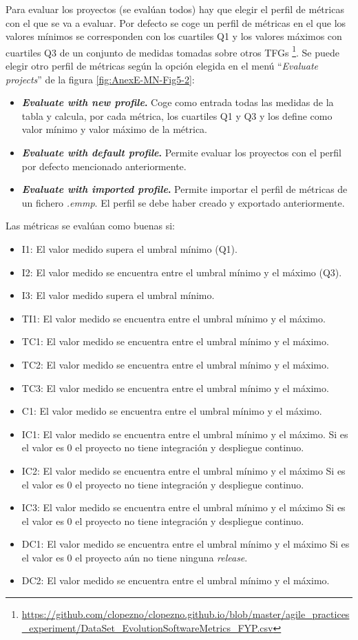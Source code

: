 Para evaluar los proyectos (se evalúan todos) hay que elegir el perfil de métricas con el que se va a evaluar. Por defecto se coge un perfil de métricas en el que los valores mínimos se corresponden con los cuartiles Q1 y los valores máximos con cuartiles Q3 de un conjunto de medidas tomadas sobre otros TFGs \footnote{\url{https://github.com/clopezno/clopezno.github.io/blob/master/agile_practices_experiment/DataSet_EvolutionSoftwareMetrics_FYP.csv}}\cite{lopez_portal_2019}. Se puede elegir otro perfil de métricas según la opción elegida en el menú ``\textit{Evaluate projects}'' de la figura \ref{fig:AnexE-MN-Fig5-2}:
\begin{itemize}
	\item \textbf{\textit{Evaluate with new profile}.} Coge como entrada todas las medidas de la tabla y calcula, por cada métrica, los cuartiles Q1 y Q3 y los define como valor mínimo y valor máximo de la métrica.
	\item \textbf{\textit{Evaluate with default profile}.} Permite evaluar los proyectos con el perfil por defecto mencionado anteriormente.
	\item \textbf{\textit{Evaluate with imported profile}.} Permite importar el perfil de métricas de un fichero \textit{.emmp}. El perfil se debe haber creado y exportado anteriormente.
\end{itemize}

Las métricas se evalúan como buenas si:
\begin{itemize}
	\item I1: El valor medido supera el umbral mínimo (Q1).
	\item I2: El valor medido se encuentra entre el umbral mínimo y el máximo (Q3).
	\item I3: El valor medido supera el umbral mínimo.
	\item TI1: El valor medido se encuentra entre el umbral mínimo y el máximo.
	\item TC1: El valor medido se encuentra entre el umbral mínimo y el máximo.
	\item TC2: El valor medido se encuentra entre el umbral mínimo y el máximo.
	\item TC3: El valor medido se encuentra entre el umbral mínimo y el máximo.
	\item C1: El valor medido se encuentra entre el umbral mínimo y el máximo.
	\item IC1: El valor medido se encuentra entre el umbral mínimo y el máximo. Si es el valor es 0 el proyecto no tiene integración y despliegue continuo.
	\item IC2: El valor medido se encuentra entre el umbral mínimo y el máximo Si es el valor es 0 el proyecto no tiene integración y despliegue continuo.
	\item IC3: El valor medido se encuentra entre el umbral mínimo y el máximo Si es el valor es 0 el proyecto no tiene integración y despliegue continuo.
	\item DC1: El valor medido se encuentra entre el umbral mínimo y el máximo Si es el valor es 0 el proyecto aún no tiene ninguna \textit{release}.
	\item DC2: El valor medido se encuentra entre el umbral mínimo y el máximo.
\end{itemize}

